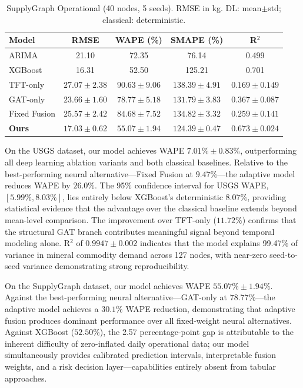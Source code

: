 \begin{table}[!t]
\caption{SupplyGraph Operational (40 nodes, 5 seeds).
RMSE in kg. DL: mean$\pm$std; classical: deterministic.}
\label{tab:sg_results}
\centering\small\setlength{\tabcolsep}{4pt}
\begin{tabular}{lcccc}
\hline
Model & RMSE & WAPE (\%) & SMAPE (\%) & R$^2$ \\
\hline
ARIMA~\cite{hyndman2018fpp}   & 21.10 & 72.35 & 76.14  & 0.499 \\
XGBoost~\cite{chen2016xgboost}& 16.31 & 52.50 & 125.21 & 0.701 \\
\hline
TFT-only~\cite{lim2021tft}   & $27.07{\pm}2.38$ & $90.63{\pm}9.06$ & $138.39{\pm}4.91$ & $0.169{\pm}0.149$ \\
GAT-only~\cite{velickovic2018gat}&$23.66{\pm}1.60$&$78.77{\pm}5.18$&$131.79{\pm}3.83$&$0.367{\pm}0.087$\\
Fixed Fusion                  & $25.57{\pm}2.42$ & $84.68{\pm}7.52$ & $134.82{\pm}3.32$ & $0.259{\pm}0.141$ \\
\textbf{Ours}                 &$\mathbf{17.03{\pm}0.62}$&$\mathbf{55.07{\pm}1.94}$&$\mathbf{124.39{\pm}0.47}$&$\mathbf{0.673{\pm}0.024}$\\
\hline
\end{tabular}
\end{table}

On the USGS dataset, our model achieves WAPE $7.01\% \pm 0.83\%$,
outperforming all deep learning ablation variants and both classical
baselines. Relative to the best-performing neural alternative---Fixed
Fusion at $9.47\%$---the adaptive model reduces WAPE by $26.0\%$.
The 95\% confidence interval for USGS WAPE, $[5.99\%, 8.03\%]$,
lies entirely below XGBoost's deterministic $8.07\%$, providing
statistical evidence that the advantage over the classical baseline
extends beyond mean-level comparison. The improvement over TFT-only
($11.72\%$) confirms that the structural GAT branch contributes
meaningful signal beyond temporal modeling alone. R$^2$ of
$0.9947 \pm 0.002$ indicates that the model explains 99.47\% of
variance in mineral commodity demand across 127 nodes, with near-zero
seed-to-seed variance demonstrating strong reproducibility.

On the SupplyGraph dataset, our model achieves WAPE $55.07\% \pm
1.94\%$. Against the best-performing neural alternative---GAT-only
at $78.77\%$---the adaptive model achieves a $30.1\%$ WAPE reduction,
demonstrating that adaptive fusion produces dominant performance over
all fixed-weight neural alternatives. Against XGBoost ($52.50\%$), the
2.57 percentage-point gap is attributable to the inherent difficulty of
zero-inflated daily operational data; our model simultaneously provides
calibrated prediction intervals, interpretable fusion weights, and a
risk decision layer---capabilities entirely absent from tabular
approaches.

